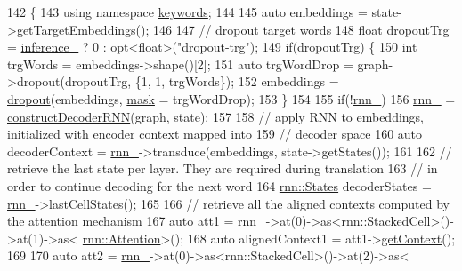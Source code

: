 \begin{DoxyCode}
142                                                           \{
143     \textcolor{keyword}{using namespace }\hyperlink{namespacekeywords}{keywords};
144 
145     \textcolor{keyword}{auto} embeddings = state->getTargetEmbeddings();
146 
147     \textcolor{comment}{// dropout target words}
148     \textcolor{keywordtype}{float} dropoutTrg = \hyperlink{classmarian_1_1DecoderBase_a808975d515f60a53096f6794c3dc61d4}{inference\_} ? 0 : opt<float>(\textcolor{stringliteral}{"dropout-trg"});
149     \textcolor{keywordflow}{if}(dropoutTrg) \{
150       \textcolor{keywordtype}{int} trgWords = embeddings->shape()[2];
151       \textcolor{keyword}{auto} trgWordDrop = graph->dropout(dropoutTrg, \{1, 1, trgWords\});
152       embeddings = \hyperlink{namespacemarian_a268400392f22176821c7c4a36733b178}{dropout}(embeddings, \hyperlink{namespacemarian_1_1keywords_a201bea6bea8108889b63081132cc3cd7}{mask} = trgWordDrop);
153     \}
154 
155     \textcolor{keywordflow}{if}(!\hyperlink{classmarian_1_1MultiDecoderS2S_aa17bae4e5a1cb917737c8d23511a5701}{rnn\_})
156       \hyperlink{classmarian_1_1MultiDecoderS2S_aa17bae4e5a1cb917737c8d23511a5701}{rnn\_} = \hyperlink{classmarian_1_1MultiDecoderS2S_a9f48a07e49a8b2608eadc93138cde75c}{constructDecoderRNN}(graph, state);
157 
158     \textcolor{comment}{// apply RNN to embeddings, initialized with encoder context mapped into}
159     \textcolor{comment}{// decoder space}
160     \textcolor{keyword}{auto} decoderContext = \hyperlink{classmarian_1_1MultiDecoderS2S_aa17bae4e5a1cb917737c8d23511a5701}{rnn\_}->transduce(embeddings, state->getStates());
161 
162     \textcolor{comment}{// retrieve the last state per layer. They are required during translation}
163     \textcolor{comment}{// in order to continue decoding for the next word}
164     \hyperlink{namespaceamunmt_a4fe2912e208820f8217fbcf229ebacf7}{rnn::States} decoderStates = \hyperlink{classmarian_1_1MultiDecoderS2S_aa17bae4e5a1cb917737c8d23511a5701}{rnn\_}->lastCellStates();
165 
166     \textcolor{comment}{// retrieve all the aligned contexts computed by the attention mechanism}
167     \textcolor{keyword}{auto} att1 = \hyperlink{classmarian_1_1MultiDecoderS2S_aa17bae4e5a1cb917737c8d23511a5701}{rnn\_}->at(0)->as<rnn::StackedCell>()->at(1)->as<
      \hyperlink{namespacemarian_1_1rnn_ae9586d2236bd64dae0a644c58d9fc76e}{rnn::Attention}>();
168     \textcolor{keyword}{auto} alignedContext1 = att1->\hyperlink{classmarian_1_1rnn_1_1GlobalAttention_ad518e4c82f56b8f95393dffa2df2288b}{getContext}();
169 
170     \textcolor{keyword}{auto} att2 = \hyperlink{classmarian_1_1MultiDecoderS2S_aa17bae4e5a1cb917737c8d23511a5701}{rnn\_}->at(0)->as<rnn::StackedCell>()->at(2)->as<

\end{DoxyCode}
